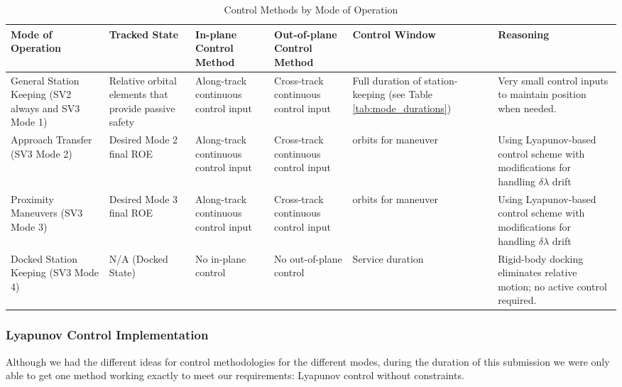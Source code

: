 
\begin{table}[H]
    \centering
    \caption{Control Methods by Mode of Operation}
    \renewcommand{\arraystretch}{1.3}

    \begin{tabularx}{\textwidth}{|>{\raggedright\arraybackslash}p{}|%
                                      >{\raggedright\arraybackslash}p{}|%
                                      >{\raggedright\arraybackslash}p{}|%
                                      >{\raggedright\arraybackslash}p{}|%
                                      >{\raggedright\arraybackslash}p{}|%
                                      >{\raggedright\arraybackslash}X|}
        \rowcolor{lightgray}
        \hline
        \textbf{Mode of Operation} & \textbf{Tracked State} & \textbf{In-plane Control Method} & \textbf{Out-of-plane Control Method} & \textbf{Control Window} & \textbf{Reasoning} \\
        \hline
        General Station Keeping (SV2 always and SV3 Mode 1) & Relative orbital elements that provide passive safety & Along-track continuous control input & Cross-track continuous control input & Full duration of station-keeping (see Table \ref{tab:mode_durations}) & Very small control inputs to maintain position when needed. \\
        \hline
        Approach Transfer (SV3 Mode 2) & Desired Mode 2 final ROE & Along-track continuous control input & Cross-track continuous control input & 15 orbits for maneuver & Using Lyapunov-based control scheme with modifications for handling $\delta \lambda $ drift\\
        \hline
        Proximity Maneuvers (SV3 Mode 3) & Desired Mode 3 final ROE & Along-track continuous control input & Cross-track continuous control input & 15 orbits for maneuver & Using Lyapunov-based control scheme with modifications for handling $\delta \lambda $ drift\\
        \hline
        Docked Station Keeping (SV3 Mode 4) & N/A (Docked State) & No in-plane control & No out-of-plane control & Service duration & Rigid-body docking eliminates relative motion; no active control required. \\
        \hline
    \end{tabularx}
    \label{tab:mode_control_methods_cont}
\end{table}


\subsubsection{Lyapunov Control Implementation}\label{sec:Lyapunov_implementation}
Although we had the different ideas for control methodologies for the different modes, during the duration of this submission we were only able to get one method working exactly to meet our requirements: Lyapunov control without constraints. 

